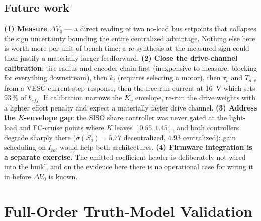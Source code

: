 \documentclass[energies,article,submit,pdftex,oneauthor]{Definitions/mdpi}
\begin{document}
\subsection{Future work}
\textbf{(1) Measure $\Delta V_0$} --- a direct reading of two no-load bus setpoints that collapses
the sign uncertainty bounding the entire centralized advantage. Nothing else here is worth more
per unit of bench time; a re-synthesis at the measured sign could then justify a materially larger
feedforward. \textbf{(2) Close the drive-channel calibration}: tire radius and encoder chain first
(inexpensive to measure, blocking for everything downstream), then $k_t$ (requires selecting a motor), then
$\tau_v$ and $T_{d,v}$ from a VESC current-step response, then the free-run current at
\SI{16}{\volt} which sets $93\,\%$ of $b_{\!e\!f\!f}$. If calibration narrows the $K_v$ envelope,
re-run the drive weights with a lighter effort penalty and expect a materially faster drive
channel. \textbf{(3) Address the $K$-envelope gap}: the SISO share controller was never gated at
the light-load and FC-cruise points where $K$ leaves $[0.55, 1.45]$, and both controllers degrade
sharply there ($\bar\sigma(S_o) = 5.77$ decentralized, $4.93$ centralized); gain scheduling on
$I_{tot}$ would help both architectures.
\textbf{(4) Firmware integration is a separate exercise.} The emitted coefficient header is
deliberately not wired into the build, and on the evidence here there is no operational case for
wiring it in before $\Delta V_0$ is known.

\vspace{6pt}





\appendixstart
\appendix

\section{Full-Order Truth-Model Validation}
\label{app:fullorder}
\end{document}
